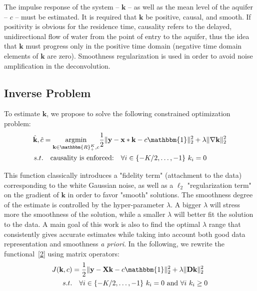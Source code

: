 \documentclass[]{elsarticle} %
\begin{document}
The impulse response of the system -- $\textbf{k}$ -- as well as the mean level of the aquifer -- $c$ -- must be estimated. It is required that $\textbf{k}$ be positive, causal, and smooth. If positivity is obvious for the residence time, causality refers to the delayed, unidirectional flow of water from the point of entry to the aquifer, thus the idea that  $\textbf{k}$ must progress only in the positive time domain (negative time domain elements of $\textbf{k}$ are zero). Smoothness regularization is used in order to avoid noise amplification in the deconvolution.


\subsection{Inverse Problem}

To estimate $\textbf{k}$, we propose to solve the following constrained optimization problem:
\begin{align}
\label{2}
\hat{\textbf{k}},  \hat{c} & = \underset{\textbf{k}\in\mathbbm{R}_+^K,c}{\text{argmin}}  \frac{1}{2} \|\textbf{y} - \textbf{x} \ast \textbf{k} - c\mathbbm{1} \|_2^2 + \lambda \|\nabla \textbf{k}\|_{2}^{2}  \\
s.t. & \quad  \text{causality is enforced:}\quad \forall i\in\{-K/2,\ldots,-1\}\ k_i = 0
\nonumber
\end{align}

This function classically introduces a "fidelity term" (attachment to the data) corresponding to the white Gaussian  noise, as well as a $\ell_2$ "regularization term" on the gradient of $\textbf{k}$ in order to favor "smooth" solutions. The smoothness degree of the estimate is controlled by the hyper-parameter $\lambda$. A bigger $\lambda$ will stress more the smoothness of the solution, while a smaller $\lambda$ will better fit the solution to the data. A main goal of this work is also to find the optimal $\lambda$ range that consistently gives accurate estimates while taking into account both good data representation and smoothness \textit{a priori}. In the following, we rewrite the functional~\eqref{2} using matrix operators:
\begin{align}
\label{3}
J(\textbf{k},c) & =   \frac{1}{2} \|\textbf{y} - \textbf{X} \textbf{k} - c\mathbbm{1} \|_2^2 + \lambda \|\textbf{D} \textbf{k}\|_{2}^{2}  \\
s.t. & \quad  \forall i\in\{-K/2,\ldots,-1\}\ k_i = 0\text{ and } \forall i\ k_i \geq 0
\nonumber
\end{align}
\end{document}
